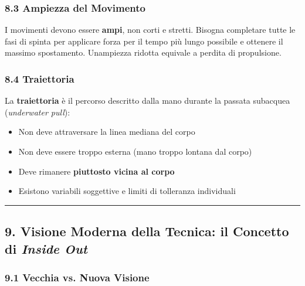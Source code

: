 \documentclass[a4paper,11pt]{article}
\providecommand{\tightlist}{%
  \setlength{\itemsep}{0pt}\setlength{\parskip}{0pt}}
\begin{document}
\subsubsection{8.3 Ampiezza del Movimento}\label{ampiezza-del-movimento}

I movimenti devono essere \textbf{ampi}, non corti e stretti. Bisogna
completare tutte le fasi di spinta per applicare forza per il tempo più
lungo possibile e ottenere il massimo spostamento.
Un\textquotesingle ampiezza ridotta equivale a perdita di propulsione.

\subsubsection{8.4 Traiettoria}\label{traiettoria}

La \textbf{traiettoria} è il percorso descritto dalla mano durante la
passata subacquea (\emph{underwater pull}):

\begin{itemize}
      \tightlist
      \item
            Non deve attraversare la linea mediana del corpo
      \item
            Non deve essere troppo esterna (mano troppo lontana dal corpo)
      \item
            Deve rimanere \textbf{piuttosto vicina al corpo}
      \item
            Esistono variabili soggettive e limiti di tolleranza individuali
\end{itemize}

\begin{center}\rule{0.5\linewidth}{0.5pt}\end{center}

\subsection{\texorpdfstring{9. Visione Moderna della Tecnica: il
            Concetto di \emph{Inside
                  Out}}{9. Visione Moderna della Tecnica: il Concetto di Inside Out}}\label{visione-moderna-della-tecnica-il-concetto-di-inside-out}

\subsubsection{9.1 Vecchia vs. Nuova
      Visione}\label{vecchia-vs.-nuova-visione}
\end{document}
